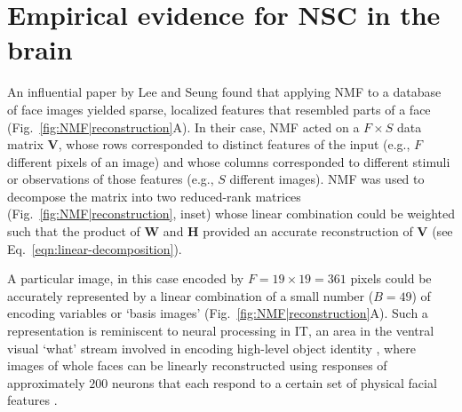 \section*{Empirical evidence for NSC in the brain}

An influential paper by Lee and Seung \cite{LeeSeung1999}
found that applying \ac{NMF} to a database of face images
yielded sparse, localized features that resembled parts of a face
(Fig.~\ref{fig:NMF|reconstruction}A).
In their case, \ac{NMF} acted on a
$F \times S$ data matrix \textbf{V},
whose rows corresponded to distinct features of the input 
(e.g., $F$ different pixels of an image)
and whose columns corresponded to different stimuli or 
observations of those features
(e.g., $S$ different images).
\ac{NMF} was used to decompose the matrix into two reduced-rank matrices
(Fig.~\ref{fig:NMF|reconstruction}, inset)
whose linear combination could be weighted such that the product of \textbf{W} and \textbf{H} provided an accurate reconstruction of \textbf{V}
(see Eq.~\ref{eqn:linear-decomposition}).

A particular image, in this case encoded by $F = 19 \times 19 = 361$ pixels
could be accurately represented by a linear combination of 
a small number ($B = 49$) of encoding variables or `basis images'
(Fig.~\ref{fig:NMF|reconstruction}A).
Such a representation is reminiscent to neural processing in \ac{IT},
an area in the ventral visual `what' stream
involved in encoding high-level object identity
\cite{BrincatConnor2004,Majaj2015},
where images of whole faces can be linearly reconstructed
using responses of approximately $200$ neurons
that each respond to a certain set of physical facial features
\cite{ChangTsao2017}.

